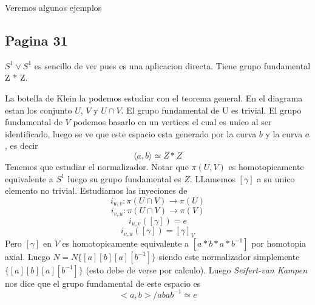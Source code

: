 \documentclass[letterpaper]{article}
\newcommand{\vank}{\emph{Seifert-van Kampen} }
\begin{document}
Veremos algunos ejemplos

\subsection*{Pagina 31}
\(S^1 \vee S^1\) es sencillo de ver pues es una aplicacion directa.
Tiene grupo fundamental Z * Z.

La botella de Klein la podemos estudiar con el teorema general. En el
diagrama estan los conjunto \(U\), \(V \) y \(U \cap V\). El grupo
fundamental de U es trivial. El grupo fundamental de \(V\) podemos
basarlo en un vertices el cual es unico al ser identificado, luego se ve
que este espacio esta generado por la curva \(b\) y la curva \(a\), es
decir
\[ \langle a,b \rangle \simeq Z * Z \]
Tenemos que estudiar el normalizador. Notar que \(\pi (U,V)\) es
homotopicamente equivalente a \(S^1\) luego su grupo fundamental es
\(Z\). LLamemos \([\gamma]\) a su unico elemento no trivial. Estudiamos
las inyeciones de
\[ i_{u,v} : \pi (U \cap V) \to \pi (U )\]
\[ i_{v,u} : \pi (U \cap V) \to \pi (V) \]
\[ i_{u,v} ([\gamma]) = e \]
\[ i_{v,u} ([\gamma]) = [\gamma]_{V} \]
Pero \([\gamma]\) en \(V\) es homotopicamente equivalente a \([a * b * a *
b^{-1}]\) por homotopia axial. Luego \(N = N \{[a][b][a][b^{-1}]\}\)
siendo este normalizador simplemente \(\{[a][b][a][b^{-1}]\}\) (esto
debe de verse por calculo). Luego \vank nos dice que el grupo
fundamental de este espacio es
\[ <a,b> / {abab^{-1} \simeq e}\]
\end{document}
